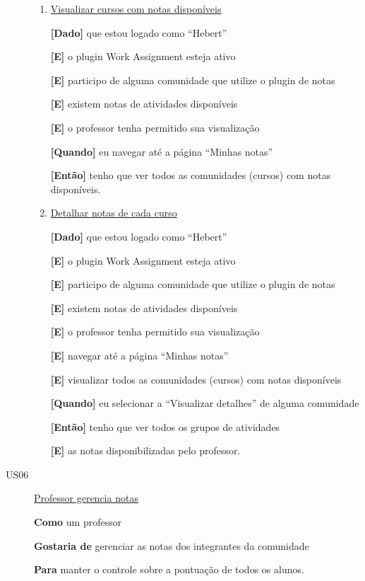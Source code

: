 \begin{description}
\begin{enumerate}
\item \underline{Visualizar cursos com notas disponíveis}

\textbf{[Dado]} que estou logado como ``Hebert''

\textbf{[E]} o plugin Work Assignment esteja ativo

\textbf{[E]} participo de alguma comunidade que utilize o plugin de notas

\textbf{[E]} existem notas de atividades disponíveis

\textbf{[E]} o professor tenha permitido sua visualização

\textbf{[Quando]} eu navegar até a página ``Minhas notas''

\textbf{[Então]} tenho que ver todos as comunidades (cursos) com notas disponíveis.

\item \underline{Detalhar notas de cada curso}

\textbf{[Dado]} que estou logado como ``Hebert''

\textbf{[E]} o plugin Work Assignment esteja ativo

\textbf{[E]} participo de alguma comunidade que utilize o plugin de notas

\textbf{[E]} existem notas de atividades disponíveis

\textbf{[E]} o professor tenha permitido sua visualização

\textbf{[E]} navegar até a página ``Minhas notas''

\textbf{[E]} visualizar todos as comunidades (cursos) com notas disponíveis

\textbf{[Quando]} eu selecionar a ``Visualizar detalhes'' de alguma comunidade

\textbf{[Então]} tenho que ver todos os grupos de atividades

\textbf{[E]} as notas disponibilizadas pelo professor.

\end{enumerate}

\item [US06\label{us06}]\underline{Professor gerencia notas}

\textbf{Como} um professor

\textbf{Gostaria de} gerenciar as notas dos integrantes da comunidade

\textbf{Para} manter o controle sobre a pontuação de todos os alunos.


\end{description}
